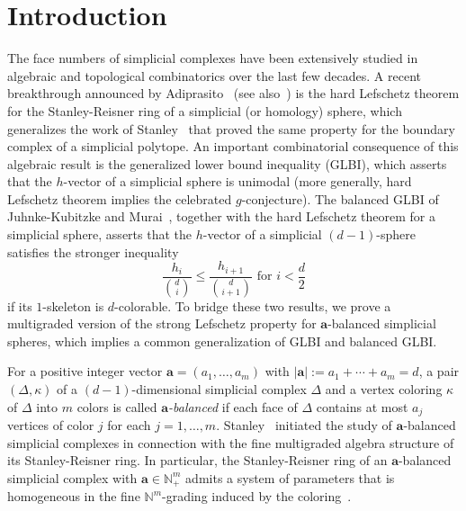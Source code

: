 \section{Introduction}
The face numbers of simplicial complexes have been extensively studied in algebraic and topological combinatorics over the last few decades.
A recent breakthrough announced by Adiprasito~\cite{Adi} (see also~\cite{APP,KX,PP}) is the hard Lefschetz theorem for the Stanley-Reisner ring of a simplicial (or homology) sphere, which generalizes the work of Stanley~\cite{Sta80} that proved the same property for the boundary complex of a simplicial polytope.
An important combinatorial consequence of this algebraic result is the generalized lower bound inequality (GLBI), which asserts that the $h$-vector of a simplicial sphere is unimodal (more generally, hard Lefschetz theorem implies the celebrated $g$-conjecture).
The balanced GLBI of Juhnke-Kubitzke and Murai~\cite{JM}, together with the hard Lefschetz theorem for a simplicial sphere, asserts that the $h$-vector of a simplicial $(d-1)$-sphere satisfies the stronger inequality 
\begin{equation} \label{eq:balancedGLBI}
\frac{h_i}{\binom{d}{i}} \leq \frac{h_{i+1}}{\binom{d}{i+1}} \text{ for } i < \frac{d}{2}
\end{equation}
if its $1$-skeleton is $d$-colorable.
To bridge these two results, we prove a multigraded version of the strong Lefschetz property for $\bm{a}$-balanced simplicial spheres, which implies a common generalization of GLBI and balanced GLBI.

For a positive integer vector $\bm{a}=(a_1,\ldots,a_m)$ with $|\bm{a}|:=a_1+\cdots+a_m=d$, a pair $(\Delta,\kappa)$ of a $(d-1)$-dimensional simplicial complex $\Delta$ and a vertex coloring $\kappa$ of $\Delta$ into $m$ colors is called \emph{$\bm{a}$-balanced} if each face of $\Delta$ contains at most $a_j$ vertices of color $j$ for each $j=1,\ldots,m$.
Stanley~\cite{Sta79} initiated the study of $\bm{a}$-balanced simplicial complexes in connection with the fine multigraded algebra structure of its Stanley-Reisner ring.
In particular, the Stanley-Reisner ring of an $\bm{a}$-balanced simplicial complex with $\bm{a} \in \mathbb{N}_+^m$ admits a system of parameters that is homogeneous in the fine $\mathbb{N}^m$-grading induced by the coloring~\cite{Sta79}. 

